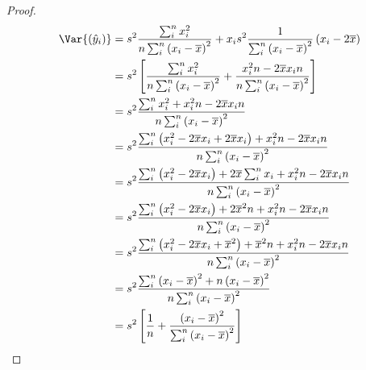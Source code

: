 \documentclass{article}
\begin{document}
\begin{proof}
    \allowdisplaybreaks{}
    \begin{align*}
        \Var{\left( \hat{y}_i \right)} & = s^2 \frac{\sum_i^n x_i^2}{n\sum_i^n \left( x_i - \overline{x} \right)^2} + x_i s^2 \frac{1}{\sum_i^n \left( x_i - \overline{x} \right)^2} \left( x_i - 2 \overline{x} \right)    \\
                                       & = s^2 \left[ \frac{\sum_i^n x_i^2}{n \sum_i^n \left( x_i - \overline{x} \right)^2} + \frac{x_i^2 n - 2 \overline{x} x_i n}{n \sum_i^n \left( x_i - \overline{x} \right)^2} \right] \\
                                       & = s^2 \frac{\sum_i^n x_i^2 + x_i^2 n - 2 \overline{x} x_i n}{n\sum_i^n \left( x_i - \overline{x} \right)^2}                                                                        \\
                                       & = s^2 \frac{\sum_i^n \left( x_i^2 - 2\overline{x}x_i + 2\overline{x} x_i \right) + x_i^2 n - 2 \overline{x} x_i n}{n\sum_i^n \left( x_i - \overline{x} \right)^2}                  \\
                                       & = s^2 \frac{\sum_i^n \left( x_i^2 - 2\overline{x}x_i \right) + 2\overline{x} \sum_i^n x_i + x_i^2 n - 2 \overline{x} x_i n}{n\sum_i^n \left( x_i - \overline{x} \right)^2}         \\
                                       & = s^2 \frac{\sum_i^n \left( x_i^2 - 2\overline{x}x_i \right) + 2\overline{x}^2 n + x_i^2 n - 2 \overline{x} x_i n}{n\sum_i^n \left( x_i - \overline{x} \right)^2}                  \\
                                       & = s^2 \frac{\sum_i^n \left( x_i^2 - 2\overline{x}x_i + \overline{x}^2 \right) + \overline{x}^2 n + x_i^2 n - 2 \overline{x} x_i n}{n\sum_i^n \left( x_i - \overline{x} \right)^2}  \\
                                       & = s^2 \frac{\sum_i^n \left( x_i - \overline{x} \right)^2 + n \left( x_i - \overline{x} \right)^2}{n\sum_i^n \left( x_i - \overline{x} \right)^2}                                   \\
                                       & = s^2 \left[ \frac{1}{n} + \frac{\left( x_i - \overline{x} \right)^2}{\sum_i^n \left( x_i - \overline{x} \right)^2} \right]
    \end{align*}
    \endgroup
\end{proof}
\end{document}

